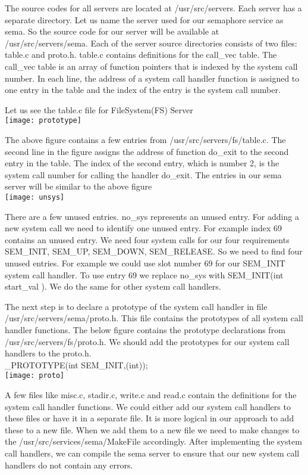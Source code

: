 \documentclass[a4paper,11pt,twocolumn]{article}
\begin{document}
The source codes for all servers are located at /usr/src/servers. Each server has a separate directory. Let us name the server used for our semaphore service as sema. So the source code for our server will be available at /usr/src/servers/sema. Each of the server source directories consists of two files: table.c and proto.h. table.c contains definitions for the call\_vec table. The call\_vec table is an array of function pointers that is indexed by the system call number. In each line, the address of a system call handler function is assigned to one entry in the table and the index of the entry is the system call number.

Let us see the table.c file for FileSystem(FS) Server\\

\texttt{[image: prototype]}

The above figure contains a few entries from /usr/src/servers/fs/table.c. The second line in the figure assigns the address of function do\_exit to the second entry in the table. The index of the second entry, which is number 2, is the system call number for calling the handler do\_exit. The entries in our sema server will be similar to the above figure\\

\texttt{[image: unsys]}

There are a few unused entries. no\_sys represents an unused entry. For adding a new system call we need to identify one unused entry. For example index 69 contains an unused entry. We need four system calls for our four requirements SEM\_INIT, SEM\_UP, SEM\_DOWN, SEM\_RELEASE. So we need to find four unused entries. For example we could use slot number 69 for our SEM\_INIT system call handler. To use entry 69 we replace no\_sys with SEM\_INIT(int start\_val ). We do the same for other system call handlers.

The next step is to declare a prototype of the system call handler in file /usr/src/servers/sema/proto.h. This file contains the prototypes of all system call handler functions. The below figure contains the prototype declarations from /usr/src/servers/fs/proto.h. We should add the prototypes for our system call handlers to the proto.h.\\

\_PROTOTYPE(int SEM\_INIT,(int));\\

\texttt{[image: proto]}

A few files like misc.c, stadir.c, write.c and read.c contain the definitions for the system call handler functions. We could either add our system call handlers to these files or have it in a separate file. It is more logical in our approach to add these to a new file. When we add them to a new file we need to make changes to the /usr/src/services/sema/MakeFile accordingly. After implementing the system call handlers, we can compile the sema server to ensure that our new system call handlers do not contain any errors.\\
\end{document}
